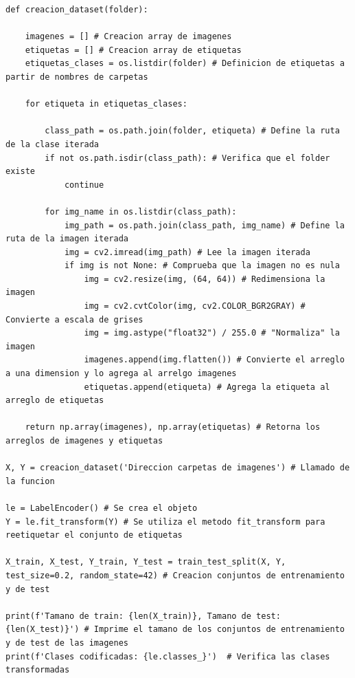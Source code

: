
\begin{lstlisting}[caption={Código creación \textit{dataset} para los modelos de \textit{sklearn}}]
def creacion_dataset(folder):
    
    imagenes = [] # Creacion array de imagenes
    etiquetas = [] # Creacion array de etiquetas
    etiquetas_clases = os.listdir(folder) # Definicion de etiquetas a partir de nombres de carpetas
    
    for etiqueta in etiquetas_clases:
        
        class_path = os.path.join(folder, etiqueta) # Define la ruta de la clase iterada
        if not os.path.isdir(class_path): # Verifica que el folder existe
            continue
        
        for img_name in os.listdir(class_path):
            img_path = os.path.join(class_path, img_name) # Define la ruta de la imagen iterada
            img = cv2.imread(img_path) # Lee la imagen iterada
            if img is not None: # Comprueba que la imagen no es nula 
                img = cv2.resize(img, (64, 64)) # Redimensiona la imagen
                img = cv2.cvtColor(img, cv2.COLOR_BGR2GRAY) # Convierte a escala de grises
                img = img.astype("float32") / 255.0 # "Normaliza" la imagen 
                imagenes.append(img.flatten()) # Convierte el arreglo a una dimension y lo agrega al arrelgo imagenes
                etiquetas.append(etiqueta) # Agrega la etiqueta al arreglo de etiquetas
                
    return np.array(imagenes), np.array(etiquetas) # Retorna los arreglos de imagenes y etiquetas

X, Y = creacion_dataset('Direccion carpetas de imagenes') # Llamado de la funcion

le = LabelEncoder() # Se crea el objeto
Y = le.fit_transform(Y) # Se utiliza el metodo fit_transform para reetiquetar el conjunto de etiquetas

X_train, X_test, Y_train, Y_test = train_test_split(X, Y, test_size=0.2, random_state=42) # Creacion conjuntos de entrenamiento y de test

print(f'Tamano de train: {len(X_train)}, Tamano de test: {len(X_test)}') # Imprime el tamano de los conjuntos de entrenamiento y de test de las imagenes
print(f'Clases codificadas: {le.classes_}')  # Verifica las clases transformadas
\end{lstlisting}

